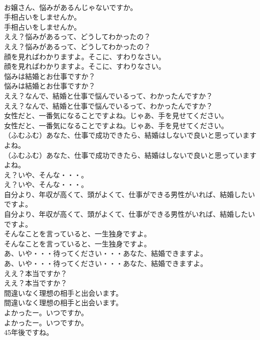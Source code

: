 \documentclass[8pt]{extreport}
\begin{document}
\begin{CJK}{UTF8}{min}
\\	お嬢さん、悩みがあるんじゃないですか。 
\\	手相占いをしませんか。	
\\	手相占いをしませんか。 
\\	ええ？悩みがあるって、どうしてわかったの？	
\\	ええ？悩みがあるって、どうしてわかったの？ 
\\	顔を見ればわかりますよ。そこに、すわりなさい。	
\\	顔を見ればわかりますよ。そこに、すわりなさい。 
\\	悩みは結婚とお仕事ですか？	
\\	悩みは結婚とお仕事ですか？ 
\\	ええ？なんで、結婚と仕事で悩んでいるって、わかったんですか？	
\\	ええ？なんで、結婚と仕事で悩んでいるって、わかったんですか？ 
\\	女性だと、一番気になることですよね。じゃあ、手を見せてください。	
\\	女性だと、一番気になることですよね。じゃあ、手を見せてください。 
\\	（ふむふむ）あなた、仕事で成功できたら、結婚はしないで良いと思っていますよね。	
\\	（ふむふむ）あなた、仕事で成功できたら、結婚はしないで良いと思っていますよね。 
\\	え？いや、そんな・・・。	
\\	え？いや、そんな・・・。 
\\	自分より、年収が高くて、頭がよくて、仕事ができる男性がいれば、結婚したいですよ。	
\\	自分より、年収が高くて、頭がよくて、仕事ができる男性がいれば、結婚したいですよ。 
\\	そんなことを言っていると、一生独身ですよ。	
\\	そんなことを言っていると、一生独身ですよ。 
\\	あ、いや・・・待ってください・・・あなた、結婚できますよ。	
\\	あ、いや・・・待ってください・・・あなた、結婚できますよ。 
\\	ええ？本当ですか？	
\\	ええ？本当ですか？ 
\\	間違いなく理想の相手と出会います。	
\\	間違いなく理想の相手と出会います。 
\\	よかったー。いつですか。	
\\	よかったー。いつですか。 
\\	45年後ですね。	

\end{CJK}
\end{document}
